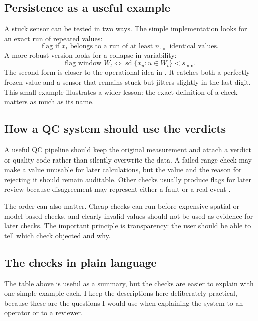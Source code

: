 \subsection{Persistence as a useful example}

A stuck sensor can be tested in two ways. The simple implementation looks
for an exact run of repeated values:
\begin{equation}
\text{flag if }x_t\text{ belongs to a run of at least }n_{\mathrm{run}}
\text{ identical values.}
\end{equation}
A more robust version looks for a collapse in variability:
\begin{equation}
\text{flag window }W_t\iff \operatorname{sd}\{x_u:u\in W_t\}<s_{\min}.
\end{equation}
The second form is closer to the operational idea in \citet{shafer2000}.
It catches both a perfectly frozen value and a sensor that remains stuck but
jitters slightly in the last digit. This small example illustrates a wider
lesson: the exact definition of a check matters as much as its name.

\subsection{How a QC system should use the verdicts}

A useful QC pipeline should keep the original measurement and attach a
verdict or quality code rather than silently overwrite the data. A failed
range check may make a value unusable for later calculations, but the value
and the reason for rejecting it should remain auditable. Other checks usually
produce flags for later review because disagreement may represent either a
fault or a real event \citep{shafer2000,campbell2013}.

The order can also matter. Cheap checks can run before expensive spatial or
model-based checks, and clearly invalid values should not be used as evidence
for later checks. The important principle is transparency: the user should
be able to tell which check objected and why.


\subsection{The checks in plain language}

The table above is useful as a summary, but the checks are easier to explain
with one simple example each. I keep the descriptions here deliberately
practical, because these are the questions I would use when explaining the
system to an operator or to a reviewer.

